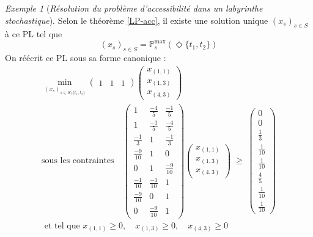 \documentclass[12pt,a4paper]{report}
\theoremstyle{definition}%
\theoremstyle{remark}
\newtheorem{example}{Exemple}[chapter]
\newcommand{\pr}{\mathbb{P}}
\begin{document}
\begin{example}[\textit{Résolution du problème d'accessibilité dans un labyrinthe stochastique}]
Selon le théorème \ref{LP-acc}, il existe une solution unique $(x_s)_{s \in S}$
à ce PL tel que \[(x_s)_{s \in S} = \pr^{\max}_s (\Diamond \{t_1, t_2\})\]
On réécrit ce PL sous sa forme canonique :
\begin{gather*}
	\min_{(x_s)_{s \in S \setminus \{ t_1, t_2\} }}
		\begin{pmatrix}
			1 & 1 & 1
		\end{pmatrix}
		\begin{pmatrix}
			x_{(1, 1)} \\[0.3em]
			x_{(1, 3)} \\[0.3em]
			x_{(4, 3)}
		\end{pmatrix}
		\\
		\text{sous les contraintes} \quad
		\begin{pmatrix}
			1 & \frac{-4}{5} & \frac{-1}{5} \\[0.3em]
			1 & \frac{-1}{5} & \frac{-4}{5} \\[0.3em]
			\frac{-1}{3} & 1 & \frac{-1}{3} \\[0.3em]
			\frac{-9}{10} & 1 & 0 \\[0.3em]
			0 & 1 & \frac{-9}{10} \\[0.3em]
			\frac{-1}{10} & \frac{-1}{10} & 1 \\[0.3em]
			\frac{-9}{10} & 0 & 1 \\[0.3em]
			0 & \frac{-9}{10} & 1
		\end{pmatrix}
		\begin{pmatrix}
			x_{(1, 1)} \\[0.3em]
			x_{(1, 3)} \\[0.3em]
			x_{(4, 3)}
		\end{pmatrix}
		\; \geq \;
		\begin{pmatrix}
			0 \\[0.3em]
			0 \\[0.3em]
			\frac{1}{3} \\[0.3em]
			\frac{1}{10} \\[0.3em]
			\frac{1}{10} \\[0.3em]
			\frac{4}{5} \\[0.3em]
			\frac{1}{10} \\[0.3em]
			\frac{1}{10}
		\end{pmatrix} \\[0.3em]
		\text{ et tel que } x_{(1, 1)} \geq 0, \quad x_{(1, 3)} \geq 0, \quad x_{(4, 3)} \geq 0

\end{gather*}
\end{example}
\end{document}
